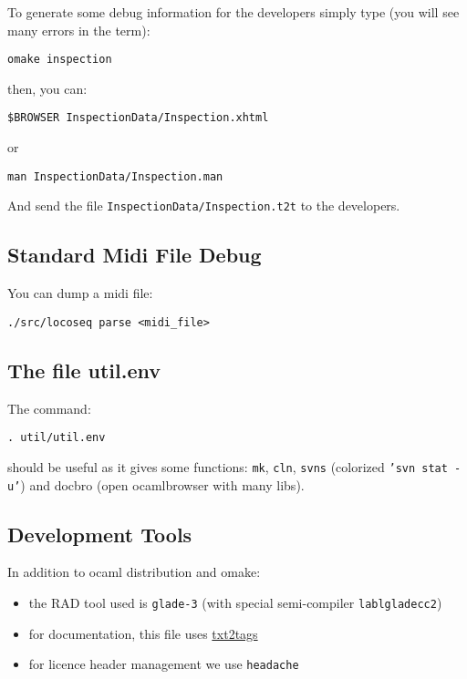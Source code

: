 To generate some debug information for the developers simply type (you will see
many errors in the term):

\begin{verbatim}
omake inspection
\end{verbatim}

then, you can:

\begin{verbatim}
$BROWSER InspectionData/Inspection.xhtml
\end{verbatim}

or

\begin{verbatim}
man InspectionData/Inspection.man
\end{verbatim}
And send the file \texttt{InspectionData/Inspection.t2t} to the developers.

\subsection{Standard Midi File Debug}
You can dump a midi file:

\begin{verbatim}
./src/locoseq parse <midi_file>
\end{verbatim}

\subsection{The file util.env}
The command:

\begin{verbatim}
. util/util.env
\end{verbatim}
should be useful as it gives some functions:
\texttt{mk}, \texttt{cln}, \texttt{svns} (colorized \texttt{'svn stat -u'}) and
docbro (open ocamlbrowser with many libs).

\subsection{Development Tools}
In addition to ocaml distribution and omake:

\begin{itemize}
  \item the RAD tool used is \texttt{glade-3} (with special semi-compiler
  \texttt{lablgladecc2})
  \item for documentation, this file uses
  \href{http://txt2tags.sourceforge.net/}{txt2tags}
  \item for licence header management we use \texttt{headache}
\end{itemize}

